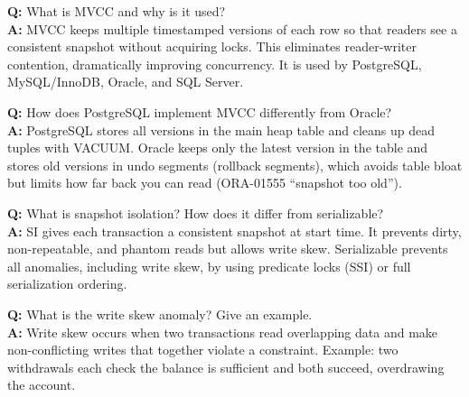 \begin{interviewbox}
\textbf{Q:} What is MVCC and why is it used?\\[4pt]
\textbf{A:} MVCC keeps multiple timestamped versions of each row so that readers see a consistent snapshot without acquiring locks.  This eliminates reader-writer contention, dramatically improving concurrency.  It is used by PostgreSQL, MySQL/InnoDB, Oracle, and SQL Server.

\vspace{6pt}
\textbf{Q:} How does PostgreSQL implement MVCC differently from Oracle?\\[4pt]
\textbf{A:} PostgreSQL stores all versions in the main heap table and cleans up dead tuples with VACUUM.  Oracle keeps only the latest version in the table and stores old versions in undo segments (rollback segments), which avoids table bloat but limits how far back you can read (ORA-01555 ``snapshot too old'').

\vspace{6pt}
\textbf{Q:} What is snapshot isolation?  How does it differ from serializable?\\[4pt]
\textbf{A:} SI gives each transaction a consistent snapshot at start time.  It prevents dirty, non-repeatable, and phantom reads but allows write skew.  Serializable prevents all anomalies, including write skew, by using predicate locks (SSI) or full serialization ordering.

\vspace{6pt}
\textbf{Q:} What is the write skew anomaly?  Give an example.\\[4pt]
\textbf{A:} Write skew occurs when two transactions read overlapping data and make non-conflicting writes that together violate a constraint.  Example: two withdrawals each check the balance is sufficient and both succeed, overdrawing the account.
\end{interviewbox}
